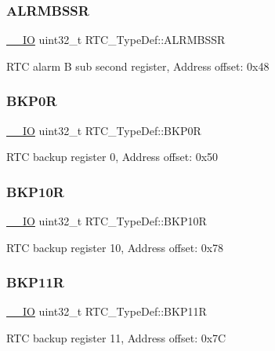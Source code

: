 \subsubsection{\texorpdfstring{ALRMBSSR}{ALRMBSSR}}
{\footnotesize\ttfamily \mbox{\hyperlink{core__sc300_8h_aec43007d9998a0a0e01faede4133d6be}{\+\_\+\+\_\+\+IO}} uint32\+\_\+t R\+T\+C\+\_\+\+Type\+Def\+::\+A\+L\+R\+M\+B\+S\+SR}

R\+TC alarm B sub second register, Address offset\+: 0x48 \mbox{\label{struct_r_t_c___type_def_ab32c76ca1f3bd0f0f46d42c2dfa74524}} 
\subsubsection{\texorpdfstring{BKP0R}{BKP0R}}
{\footnotesize\ttfamily \mbox{\hyperlink{core__sc300_8h_aec43007d9998a0a0e01faede4133d6be}{\+\_\+\+\_\+\+IO}} uint32\+\_\+t R\+T\+C\+\_\+\+Type\+Def\+::\+B\+K\+P0R}

R\+TC backup register 0, Address offset\+: 0x50 \mbox{\label{struct_r_t_c___type_def_a5feba3d5adae3f234b3d172459163c5a}} 
\subsubsection{\texorpdfstring{BKP10R}{BKP10R}}
{\footnotesize\ttfamily \mbox{\hyperlink{core__sc300_8h_aec43007d9998a0a0e01faede4133d6be}{\+\_\+\+\_\+\+IO}} uint32\+\_\+t R\+T\+C\+\_\+\+Type\+Def\+::\+B\+K\+P10R}

R\+TC backup register 10, Address offset\+: 0x78 \mbox{\label{struct_r_t_c___type_def_a8fef38e1e122778601e18f5b757c037a}} 
\subsubsection{\texorpdfstring{BKP11R}{BKP11R}}
{\footnotesize\ttfamily \mbox{\hyperlink{core__sc300_8h_aec43007d9998a0a0e01faede4133d6be}{\+\_\+\+\_\+\+IO}} uint32\+\_\+t R\+T\+C\+\_\+\+Type\+Def\+::\+B\+K\+P11R}

R\+TC backup register 11, Address offset\+: 0x7C \mbox{\label{struct_r_t_c___type_def_a6606b5d249f923aa15ab74b382cbaf7e}} 
